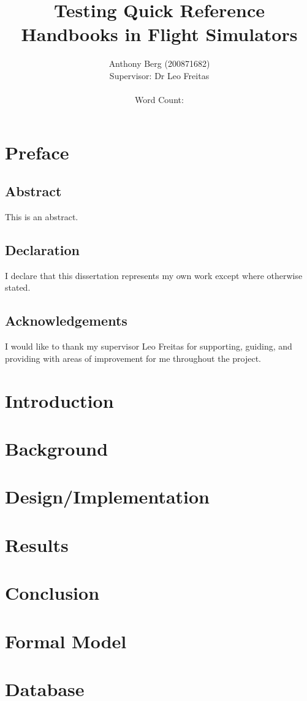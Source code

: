 \documentclass[british, twoside]{report}
\author{Anthony Berg (200871682)\\
Supervisor: Dr Leo Freitas\\\\
Word Count: \wordcount}
\title{Testing Quick Reference Handbooks in Flight Simulators}
\begin{document}
\maketitle

\chapter*{Preface}
\section*{Abstract}
This is an abstract.

\section*{Declaration}
I declare that this dissertation represents my own work except where otherwise stated.

\section*{Acknowledgements}
I would like to thank my supervisor Leo Freitas for supporting, guiding, and providing
with areas of improvement for me throughout the project.

\tableofcontents

\chapter{Introduction}


\chapter{Background}


\chapter{Design/Implementation}


\chapter{Results}


\chapter{Conclusion}


\appendix
\chapter{Formal Model}


\chapter{Database}


\nocite{*}
\printbibliography[heading=bibintoc, title={References}]
\end{document}
